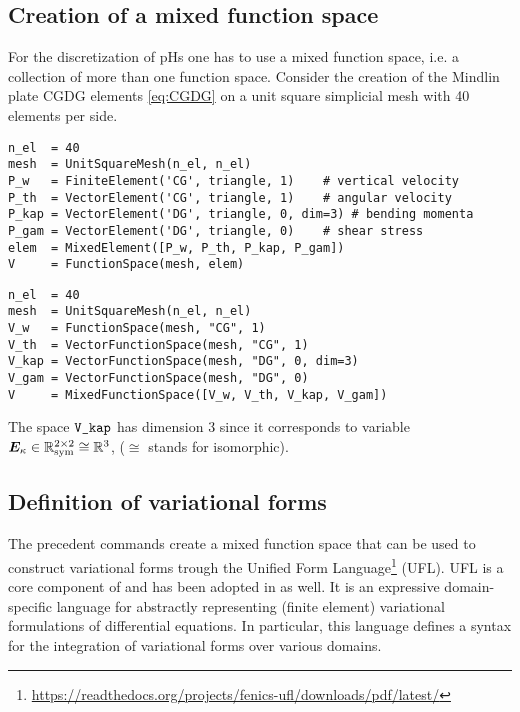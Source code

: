 \subsection*{Creation of a mixed function space}
For the discretization of pHs one has to use a mixed function space, i.e. a collection of more than one function space. Consider the creation of the Mindlin plate CGDG elements \eqref{eq:CGDG} on a unit square simplicial mesh with 40 elements per side.
\begin{tcolorbox}[title = Mixed function space in  \fenics, coltitle=black, breakable, size=fbox, boxrule=1pt, pad at break*=1mm, colframe=red, enlarge top by=0.25em, enlarge bottom by=0.5em]
\begin{Verbatim}[tabsize=4]
n_el  = 40
mesh  = UnitSquareMesh(n_el, n_el)
P_w   = FiniteElement('CG', triangle, 1)   	# vertical velocity
P_th  = VectorElement('CG', triangle, 1)   	# angular velocity
P_kap = VectorElement('DG', triangle, 0, dim=3)	# bending momenta			
P_gam = VectorElement('DG', triangle, 0)	# shear stress 
elem  = MixedElement([P_w, P_th, P_kap, P_gam])
V     = FunctionSpace(mesh, elem)
\end{Verbatim}
\end{tcolorbox}
\begin{tcolorbox}[title = Mixed function space in  \firedrake, coltitle=black, breakable, size=fbox, boxrule=1pt, pad at break*=1mm, colframe=cyan, enlarge top by=0.25em, enlarge bottom by=0.5em]
\begin{Verbatim}[tabsize=4]
n_el  = 40
mesh  = UnitSquareMesh(n_el, n_el)
V_w   = FunctionSpace(mesh, "CG", 1)
V_th  = VectorFunctionSpace(mesh, "CG", 1)
V_kap = VectorFunctionSpace(mesh, "DG", 0, dim=3)
V_gam = VectorFunctionSpace(mesh, "DG", 0)
V     = MixedFunctionSpace([V_w, V_th, V_kap, V_gam])
\end{Verbatim}
\end{tcolorbox}
The space $\verb|V_kap|$ has dimension 3 since it corresponds to variable $\bm{E}_\kappa \in \mathbb{R}^{2\times 2}_{\text{sym}} \cong  \mathbb{R}^3$, ($\cong$ stands for isomorphic).

\subsection*{Definition of variational forms}
The precedent commands create a mixed function space that can be used to construct variational forms trough the Unified Form Language\footnote{\url{https://readthedocs.org/projects/fenics-ufl/downloads/pdf/latest/}} \cite{alnaes2014} (UFL). UFL is a core component of \fenics and has been adopted in \firedrake as well. It is an expressive domain-specific language for abstractly representing (finite element) variational formulations of differential equations. In particular, this language defines a syntax for the integration of variational forms over various domains. \\

